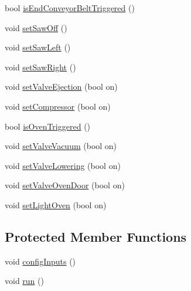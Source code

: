 \begin{DoxyCompactItemize}
bool \hyperlink{classft_1_1_txt_multi_processing_station_a9abbcaf52138bafff050f52f574989e7}{is\+End\+Conveyor\+Belt\+Triggered} ()
\item 
void \hyperlink{classft_1_1_txt_multi_processing_station_a661ed9cee1b89aee262855bd03bbc371}{set\+Saw\+Off} ()
\item 
void \hyperlink{classft_1_1_txt_multi_processing_station_a0c4e7033897105daa634cf05ec1eb1d3}{set\+Saw\+Left} ()
\item 
void \hyperlink{classft_1_1_txt_multi_processing_station_af7e3e39a553c378d85f45fcf16ed2afe}{set\+Saw\+Right} ()
\item 
void \hyperlink{classft_1_1_txt_multi_processing_station_a302280bfcc3fc16a48a75746a249d603}{set\+Valve\+Ejection} (bool on)
\item 
void \hyperlink{classft_1_1_txt_multi_processing_station_a6cab40a75e0eccfe79fb0b1f65fb4ccb}{set\+Compressor} (bool on)
\item 
bool \hyperlink{classft_1_1_txt_multi_processing_station_ad49dbbf4007296e16f88e7d79a784e5c}{is\+Oven\+Triggered} ()
\item 
void \hyperlink{classft_1_1_txt_multi_processing_station_a2073f71234e6781c7eac48ff175f1c9a}{set\+Valve\+Vacuum} (bool on)
\item 
void \hyperlink{classft_1_1_txt_multi_processing_station_a9a6a259c42adea74fcc8b28bc252018f}{set\+Valve\+Lowering} (bool on)
\item 
void \hyperlink{classft_1_1_txt_multi_processing_station_abd0a00403958e599db70cfc7881ac36b}{set\+Valve\+Oven\+Door} (bool on)
\item 
void \hyperlink{classft_1_1_txt_multi_processing_station_a07d02c905529bf5adc7ad5bc5bbd7089}{set\+Light\+Oven} (bool on)
\end{DoxyCompactItemize}
\subsection*{Protected Member Functions}
\begin{DoxyCompactItemize}
\item 
void \hyperlink{classft_1_1_txt_multi_processing_station_a17489170af6848fd7545a514a16c6eb7}{config\+Inputs} ()
\item 
void \hyperlink{classft_1_1_txt_multi_processing_station_a5e660a44e3e5bbbcfd79bc73bc18a949}{run} ()
\end{DoxyCompactItemize}

